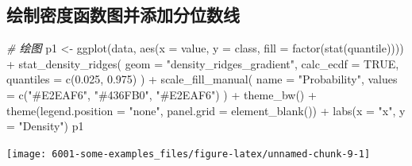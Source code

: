 \documentclass[
]{book}
\newenvironment{Shaded}{\begin{snugshade}}{\end{snugshade}}
\newcommand{\AttributeTok}[1]{\textcolor[rgb]{0.77,0.63,0.00}{#1}}
\newcommand{\CommentTok}[1]{\textcolor[rgb]{0.56,0.35,0.01}{\textit{#1}}}
\newcommand{\ConstantTok}[1]{\textcolor[rgb]{0.00,0.00,0.00}{#1}}
\newcommand{\FloatTok}[1]{\textcolor[rgb]{0.00,0.00,0.81}{#1}}
\newcommand{\FunctionTok}[1]{\textcolor[rgb]{0.00,0.00,0.00}{#1}}
\newcommand{\NormalTok}[1]{#1}
\newcommand{\OtherTok}[1]{\textcolor[rgb]{0.56,0.35,0.01}{#1}}
\newcommand{\SpecialCharTok}[1]{\textcolor[rgb]{0.00,0.00,0.00}{#1}}
\newcommand{\StringTok}[1]{\textcolor[rgb]{0.31,0.60,0.02}{#1}}
\begin{document}
\hypertarget{ux7ed8ux5236ux5bc6ux5ea6ux51fdux6570ux56feux5e76ux6dfbux52a0ux5206ux4f4dux6570ux7ebf}{%
\subsection{绘制密度函数图并添加分位数线}\label{ux7ed8ux5236ux5bc6ux5ea6ux51fdux6570ux56feux5e76ux6dfbux52a0ux5206ux4f4dux6570ux7ebf}}

\begin{Shaded}
\begin{Highlighting}[]
\CommentTok{\# 绘图}
\NormalTok{p1 }\OtherTok{\textless{}{-}} \FunctionTok{ggplot}\NormalTok{(data, }\FunctionTok{aes}\NormalTok{(}\AttributeTok{x =}\NormalTok{ value, }\AttributeTok{y =}\NormalTok{ class, }\AttributeTok{fill =} \FunctionTok{factor}\NormalTok{(}\FunctionTok{stat}\NormalTok{(quantile)))) }\SpecialCharTok{+}
  \FunctionTok{stat\_density\_ridges}\NormalTok{(}
    \AttributeTok{geom =} \StringTok{"density\_ridges\_gradient"}\NormalTok{,}
    \AttributeTok{calc\_ecdf =} \ConstantTok{TRUE}\NormalTok{,}
    \AttributeTok{quantiles =} \FunctionTok{c}\NormalTok{(}\FloatTok{0.025}\NormalTok{, }\FloatTok{0.975}\NormalTok{)}
\NormalTok{  ) }\SpecialCharTok{+}
  \FunctionTok{scale\_fill\_manual}\NormalTok{(}
    \AttributeTok{name =} \StringTok{"Probability"}\NormalTok{, }\AttributeTok{values =} \FunctionTok{c}\NormalTok{(}\StringTok{"\#E2EAF6"}\NormalTok{, }\StringTok{"\#436FB0"}\NormalTok{, }\StringTok{"\#E2EAF6"}\NormalTok{)}
\NormalTok{  ) }\SpecialCharTok{+}
  \FunctionTok{theme\_bw}\NormalTok{() }\SpecialCharTok{+}
  \FunctionTok{theme}\NormalTok{(}\AttributeTok{legend.position =} \StringTok{"none"}\NormalTok{, }\AttributeTok{panel.grid =} \FunctionTok{element\_blank}\NormalTok{()) }\SpecialCharTok{+}
  \FunctionTok{labs}\NormalTok{(}\AttributeTok{x =} \StringTok{"x"}\NormalTok{, }\AttributeTok{y =} \StringTok{"Density"}\NormalTok{)}
\NormalTok{p1}
\end{Highlighting}
\end{Shaded}

\begin{center}\texttt{[image: 6001-some-examples\_files/figure-latex/unnamed-chunk-9-1]} \end{center}
\end{document}
